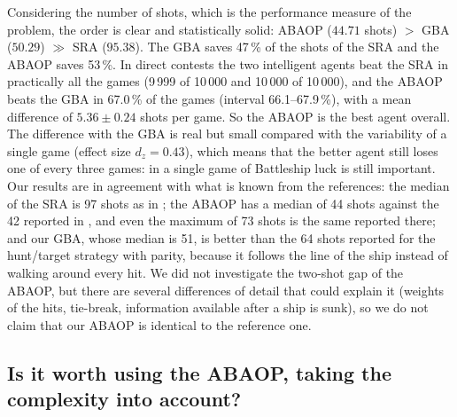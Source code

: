 \documentclass[letterpaper,11pt]{article} %
\begin{document}
Considering the number of shots, which is the performance measure of the problem, the order is clear and statistically solid: ABAOP ($44.71$ shots) $>$ GBA ($50.29$) $\gg$ SRA ($95.38$). The GBA saves 47\,\% of the shots of the SRA and the ABAOP saves 53\,\%. In direct contests the two intelligent agents beat the SRA in practically all the games (9\,999 of 10\,000 and 10\,000 of 10\,000), and the ABAOP beats the GBA in 67.0\,\% of the games (interval 66.1--67.9\,\%), with a mean difference of $5.36\pm0.24$ shots per game.
So the ABAOP is the best agent overall. The difference with the GBA is real but small compared with the variability of a single game (effect size $d_z=0.43$), which means that the better agent still loses one of every three games: in a single game of Battleship luck is still important.
Our results are in agreement with what is known from the references: the median of the SRA is 97 shots as in \cite{berry2011,schwartz2022}; the ABAOP has a median of 44 shots against the 42 reported in \cite{berry2011}, and even the maximum of 73 shots is the same reported there; and our GBA, whose median is 51, is better than the 64 shots reported for the hunt/target strategy with parity, because it follows the line of the ship instead of walking around every hit. We did not investigate the two-shot gap of the ABAOP, but there are several differences of detail that could explain it (weights of the hits, tie-break, information available after a ship is sunk), so we do not claim that our ABAOP is identical to the reference one.

\subsection{Is it worth using the ABAOP, taking the complexity into account?}
\end{document}
